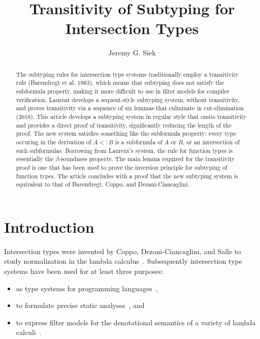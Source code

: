 \documentclass{article}
\title{Transitivity of Subtyping for Intersection Types}
\author{Jeremy G. Siek}
\begin{document}
\maketitle

\newcommand{\TOP}{\ensuremath{\mathtt{U}}}
\newcommand{\dom}[1]{\cap\mathsf{dom}(#1)}
\newcommand{\cod}[1]{\cap\mathsf{cod}(#1)}
\newcommand{\topP}[1]{\mathsf{top}(#1)}
\newcommand{\topInCod}[1]{\mathsf{topInCod}(#1)}
\newcommand{\depth}[1]{\mathsf{depth}(#1)}
\newcommand{\size}[1]{\mathsf{size}(#1)}
\newcommand{\inside}[0]{\inplus}
\newcommand{\contains}[0]{\subsetpluseq}


\begin{abstract}
  The subtyping rules for intersection type systems traditionally
  employ a transitivity rule (Barendregt et al. 1983), which means
  that subtyping does not satisfy the subformula property, making it
  more difficult to use in filter models for compiler verification.
  Laurent develops a sequent-style subtyping system, without
  transitivity, and proves transitivity via a sequence of six lemmas
  that culminate in cut-elimination (2018). This article develops a
  subtyping system in regular style that omits transitivity and
  provides a direct proof of transitivity, significantly reducing the
  length of the proof. The new system satisfies something like the
  subformula property: every type occuring in the derivation of $A <:
  B$ is a subformula of $A$ or $B$, or an intersection of such
  subformulas.  Borrowing from Laurent's system, the rule for function
  types is essentially the $\beta$-soundness property.  The main lemma
  required for the transitivity proof is one that has been used to
  prove the inversion principle for subtyping of function types. The
  article concludes with a proof that the new subtyping system is
  equivalent to that of Barendregt, Coppo, and Dezani-Ciancaglini.
\end{abstract}

\section{Introduction}

Intersection types were invented by Coppo, Dezani-Ciancaglini, and
Salle to study normalization in the lambda
calculus~\citep{Coppo:1979aa}. Subsequently intersection type systems
have been used for at least three purposes:
\begin{itemize}
  \item as type systems for programming
    languages~\citep{Reynolds:1988aa,Pierce:1991aa,Castagna:2014aa,Chaudhuri:2014aa,Oliveira:2016aa,Muehlboeck:2018aa,Bi:2019aa,Dunfield:2019aa,Microsoft:TypeScript2020aa,Dotty:2020aa},
  \item to formulate precise static
    analyses~\citep{Turbak:1997aa,Palsberg:1998aa,Mossin:2003aa,Simoes:2007aa},
    and
  \item to express filter models for the denotational semantics of a
    variety of lambda
    calculi~\citep{Coppo:1980ab,Coppo:1981aa,Coppo:1984aa,Honsell:1992aa,Abramsky:1993fk,Honsell:1999aa,Ishihara:2002aa,Rocca:2004aa,Dezani-Ciancaglini:2005aa,Alessi:2006aa,Barendregt:2013aa}.
\end{itemize}
\end{document}

